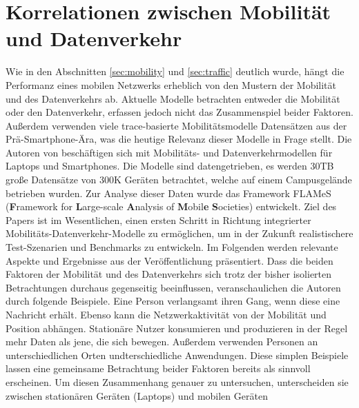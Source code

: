 \documentclass[12pt, a4paper]{article}
\begin{document}
\vfill

\pagebreak

\section{Korrelationen zwischen Mobilität und Datenverkehr}

Wie in den Abschnitten \ref{sec:mobility} und \ref{sec:traffic} deutlich wurde, hängt die Performanz eines mobilen
Netzwerks erheblich von den Mustern der Mobilität und des Datenverkehrs ab.
\newline\newline
Aktuelle Modelle betrachten entweder die Mobilität oder den Datenverkehr, erfassen jedoch nicht das Zusammenspiel beider Faktoren.
Außerdem verwenden viele trace-basierte Mobilitätsmodelle Datensätzen aus der Prä-Smartphone-Ära,
was die heutige Relevanz dieser Modelle in Frage stellt. \cite{Alipour2018}\newline
Die Autoren von \cite{Alipour2018} beschäftigen sich mit Mobilitäts- und Datenverkehrmodellen für Laptops und Smartphones.
Die Modelle sind datengetrieben, es werden $30$\textsc{TB} große Datensätze von $300$\textsc{K} Geräten betrachtet, welche auf einem Campusgelände
betrieben wurden. Zur Analyse dieser Daten wurde das Framework FLAMeS (\textbf{F}ramework for \textbf{L}arge-scale \textbf{A}nalysis of \textbf{M}obil\textbf{e} \textbf{S}ocieties) entwickelt.
Ziel des Papers ist im Wesentlichen, einen ersten Schritt in Richtung integrierter Mobilitäts-Datenverkehr-Modelle 
zu ermöglichen, um in der Zukunft realistischere Test-Szenarien und Benchmarks zu entwickeln. Im Folgenden werden relevante
Aspekte und Ergebnisse aus der Veröffentlichung präsentiert.\newline
Dass die beiden Faktoren der Mobilität und des Datenverkehrs sich trotz der bisher isolierten Betrachtungen
durchaus gegenseitig beeinflussen, veranschaulichen die Autoren durch folgende Beispiele. 
Eine Person verlangsamt ihren Gang, wenn diese eine Nachricht erhält. Ebenso kann die Netzwerkaktivität von der
Mobilität und Position abhängen. Stationäre Nutzer konsumieren und produzieren in der Regel mehr Daten als jene, 
die sich bewegen. Außerdem verwenden Personen an unterschiedlichen Orten undterschiedliche Anwendungen.
Diese simplen Beispiele lassen eine gemeinsame Betrachtung beider Faktoren bereits als sinnvoll erscheinen.
\newline\newline
Um diesen Zusammenhang genauer zu untersuchen, unterscheiden sie zwischen stationären Geräten (Laptops) und mobilen Geräten
\end{document}
